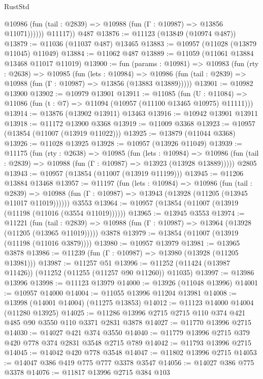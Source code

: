 \begin{lexlean}{RustStd}
\begin{coremodule}
              @10986 (fun (tail : @2839) => @10988 (fun (Γ : @10987) => @13856 @11071))))))
        @11117))
    @487
@13876 := @11123 (@13849 (@10974 @487))
@13879 := @11036 (@11037 @487) @13465
@13883 := @10957 (@11028 (@13879 @11045) @11049)
@13884 := @11062 @487
@13889 := @11059 (@11061 @13884 @13468 @11017 @11019)
@13900 := fun (params : @10981) =>
  @10983
    (fun (rty : @2638) =>
    @10985
      (fun (lets : @10984) =>
      @10986 (fun (tail : @2839) => @10988 (fun (Γ : @10987) => @13856 (@13883 @13889)))))
@13901 := @10982 @13900
@13902 := @10979 @13901
@13911 := @11085
    (fun (U : @11084) => @11086 (fun (t : @7) => @11094 (@10957 (@11100 @13465 @10975) @11111)))
@13914 := @13876 (@13902 @13911) @13463
@13916 := @10942 @13901 @13911
@13918 := @11172 @13900 @3368
@13919 := @11009 @3368
@13923 := @10957 (@13854 (@11007 (@13919 @11022)))
@13925 := @13879 (@11044 @3368)
@13926 := @11028 @13925
@13928 := @10957 (@13926 @11049)
@13939 := @11175
    (fun (rty : @2638) =>
    @10985
      (fun (lets : @10984) =>
      @10986 (fun (tail : @2839) => @10988 (fun (Γ : @10987) => @13923 (@13928 @13889)))))
    @2805
@13943 := @10957 (@13854 (@11007 (@13919 @11199)))
@13945 := @11206 @13884 @13468
@13957 := @11197
    (fun (lets : @10984) =>
    @10986
      (fun (tail : @2839) =>
      @10988 (fun (Γ : @10987) => @13943 (@13928 (@11205 (@13945 @11017 @11019))))))
    @3553
@13964 := @10957 (@13854 (@11007 (@13919 (@11198 (@11016 (@3554 @11019))))))
@13965 := @13945 @3553
@13974 := @11221
    (fun (tail : @2839) => @10988 (fun (Γ : @10987) => @13964 (@13928 (@11205 (@13965 @11019)))))
    @3878
@13979 := @13854 (@11007 (@13919 (@11198 (@11016 @3879))))
@13980 := @10957 @13979
@13981 := @13965 @3878
@13986 := @11239 (fun (Γ : @10987) => @13980 (@13928 (@11205 @13981)))
@13987 := @11257 @51
@13996 := @11252 (@11424 (@13987 @11426)) (@11252 (@11255 (@11257 @90 @11260)) @11035)
@13997 := @13986 @13996
@13998 := @11123 @13979
@14000 := @13926 (@11048 @13996)
@14001 := @10957 @14000
@14004 := @11055 @13996 @11204 @13981
@14008 := @13998 (@14001 @14004) (@11275 @13853)
@14012 := @11123 @14000 @14004 (@11280 @13925)
@14025 := @11286 @13996 @2715 @2715 @110 @374 @421 @485 @90 @3550 @110 @3371 @2831 @3878
@14027 := @11770 @13996 @2715
@14030 := @14027 @421 @374 @3550
@14040 := @11779 @13996 @2715 @379 @420 @778 @374 @2831 @3548 @2715 @789
@14042 := @11793 @13996 @2715
@14045 := @14042 @420 @778 @3548
@14047 := @11802 @13996 @2715
@14053 := @14047 @386 @419 @775 @777 @3378 @3547
@14056 := @14027 @386 @775 @3378
@14076 := @11817
    @13996
    @2715
    @384
    @103

\end{coremodule}
\end{lexlean}
